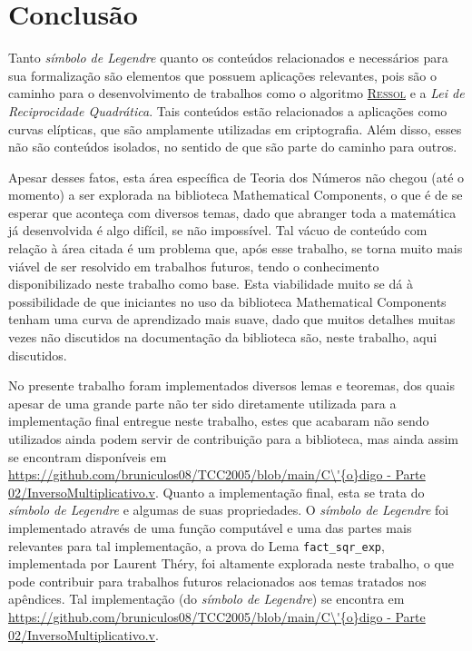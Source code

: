 \chapter{Conclusão}
\label{cap:conclusao}

Tanto \textit{símbolo de Legendre} quanto os conteúdos relacionados e necessários para sua formalização são elementos que possuem aplicações relevantes, pois são o caminho para o desenvolvimento de trabalhos como o algoritmo \hyperref[algo:ressol]{\textsc{Ressol}} e a \textit{Lei de Reciprocidade Quadrática}. Tais conteúdos estão relacionados a aplicações como curvas elípticas, que são amplamente utilizadas em criptografia. Além disso, esses não são conteúdos isolados, no sentido de que são parte do caminho para outros.

Apesar desses fatos, esta área específica de Teoria dos Números não chegou (até o momento) a ser explorada na biblioteca Mathematical Components, o que é de se esperar que aconteça com diversos temas, dado que abranger toda a matemática já desenvolvida é algo difícil, se não impossível. Tal vácuo de conteúdo com relação à área citada é um problema que, após esse trabalho, se torna muito mais viável de ser resolvido em trabalhos futuros, tendo o conhecimento disponibilizado neste trabalho como base. Esta viabilidade muito se dá à possibilidade de que iniciantes no uso da biblioteca Mathematical Components tenham uma curva de aprendizado mais suave, dado que muitos detalhes muitas vezes não discutidos na documentação da biblioteca são, neste trabalho, aqui discutidos.

No presente trabalho foram implementados diversos lemas e teoremas, dos quais apesar de uma grande parte não ter sido diretamente utilizada para a implementação final entregue neste trabalho, estes que acabaram não sendo utilizados ainda podem servir de contribuição para a biblioteca, mas ainda assim se encontram disponíveis em \url{https://github.com/bruniculos08/TCC2005/blob/main/C\'{o}digo - Parte 02/InversoMultiplicativo.v}. Quanto a implementação final, esta se trata do \textit{símbolo de Legendre} e algumas de suas propriedades. O \textit{símbolo de Legendre} foi implementado através de uma função computável e uma das partes mais relevantes para tal implementação, a prova do Lema \lstinline[language=coq]|fact_sqr_exp|, implementada por Laurent Théry, foi altamente explorada neste trabalho, o que pode contribuir para trabalhos futuros relacionados aos temas tratados nos apêndices. Tal implementação (do \textit{símbolo de Legendre}) se encontra em \url{https://github.com/bruniculos08/TCC2005/blob/main/C\'{o}digo - Parte 02/InversoMultiplicativo.v}.

